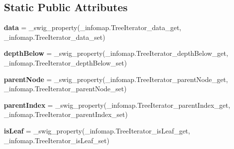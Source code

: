 \subsection*{Static Public Attributes}
\begin{DoxyCompactItemize}
\item 
\mbox{\label{classdsmacc_1_1graph_1_1infomap_1_1infomap_1_1TreeIterator_a3b63267c19019364efb79e66064ad686}} 
{\bfseries data} = \+\_\+swig\+\_\+property(\+\_\+infomap.\+Tree\+Iterator\+\_\+data\+\_\+get, \+\_\+infomap.\+Tree\+Iterator\+\_\+data\+\_\+set)
\item 
\mbox{\label{classdsmacc_1_1graph_1_1infomap_1_1infomap_1_1TreeIterator_a4ac8d13d48205b11dcf9ea60f5ab9247}} 
{\bfseries depth\+Below} = \+\_\+swig\+\_\+property(\+\_\+infomap.\+Tree\+Iterator\+\_\+depth\+Below\+\_\+get, \+\_\+infomap.\+Tree\+Iterator\+\_\+depth\+Below\+\_\+set)
\item 
\mbox{\label{classdsmacc_1_1graph_1_1infomap_1_1infomap_1_1TreeIterator_a6c3558da193c66d0a8f0dc2d6addad2b}} 
{\bfseries parent\+Node} = \+\_\+swig\+\_\+property(\+\_\+infomap.\+Tree\+Iterator\+\_\+parent\+Node\+\_\+get, \+\_\+infomap.\+Tree\+Iterator\+\_\+parent\+Node\+\_\+set)
\item 
\mbox{\label{classdsmacc_1_1graph_1_1infomap_1_1infomap_1_1TreeIterator_a92edea41e01102676fb28e7b2439ccaf}} 
{\bfseries parent\+Index} = \+\_\+swig\+\_\+property(\+\_\+infomap.\+Tree\+Iterator\+\_\+parent\+Index\+\_\+get, \+\_\+infomap.\+Tree\+Iterator\+\_\+parent\+Index\+\_\+set)
\item 
\mbox{\label{classdsmacc_1_1graph_1_1infomap_1_1infomap_1_1TreeIterator_a564b2a6091b453c29d44b06943424004}} 
{\bfseries is\+Leaf} = \+\_\+swig\+\_\+property(\+\_\+infomap.\+Tree\+Iterator\+\_\+is\+Leaf\+\_\+get, \+\_\+infomap.\+Tree\+Iterator\+\_\+is\+Leaf\+\_\+set)
\item 
\mbox{\label{classdsmacc_1_1graph_1_1infomap_1_1infomap_1_1TreeIterator_aef2250fa15ed76e8210da79ffc067876}} 

\end{DoxyCompactItemize}
